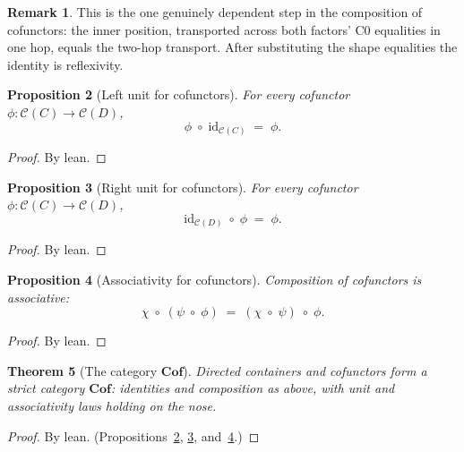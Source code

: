 \documentclass[11pt,a4paper]{article}
\theoremstyle{plain}
\newtheorem{theorem}{Theorem}[section]
\newtheorem{proposition}[theorem]{Proposition}
\theoremstyle{definition}
\newtheorem{remark}[theorem]{Remark}
\newcommand{\id}{\mathrm{id}}
\newcommand{\cat}{\mathcal{C}}
\newcommand{\Cof}{\mathbf{Cof}}
\begin{document}
\begin{remark}
This is the one genuinely dependent step in the composition of cofunctors:
the inner position, transported across both factors' C0 equalities in one hop,
equals the two-hop transport. After substituting the shape equalities the
identity is reflexivity.
\end{remark}

\begin{proposition}[Left unit for cofunctors]\label{prop:cof-id-comp}
For every cofunctor $\phi:\cat(C)\to\cat(D)$,
\begin{equation}
  \phi \;\circ\; \id_{\cat(C)} \;=\; \phi.
\end{equation}
\end{proposition}

\begin{proof}
By lean.
\end{proof}

\begin{proposition}[Right unit for cofunctors]\label{prop:cof-comp-id}
For every cofunctor $\phi:\cat(C)\to\cat(D)$,
\begin{equation}
  \id_{\cat(D)} \;\circ\; \phi \;=\; \phi.
\end{equation}
\end{proposition}

\begin{proof}
By lean.
\end{proof}

\begin{proposition}[Associativity for cofunctors]\label{prop:cof-assoc}
Composition of cofunctors is associative:
\begin{equation}
  \chi \;\circ\; (\psi \;\circ\; \phi)
  \;=\;
  (\chi \;\circ\; \psi) \;\circ\; \phi.
\end{equation}
\end{proposition}

\begin{proof}
By lean.
\end{proof}

\begin{theorem}[The category $\Cof$]\label{thm:cof-cat}
Directed containers and cofunctors form a strict category $\Cof$: identities
and composition as above, with unit and associativity laws holding on the
nose.
\end{theorem}

\begin{proof}
By lean. (Propositions~\ref{prop:cof-id-comp}, \ref{prop:cof-comp-id},
and~\ref{prop:cof-assoc}.)
\end{proof}
\end{document}
